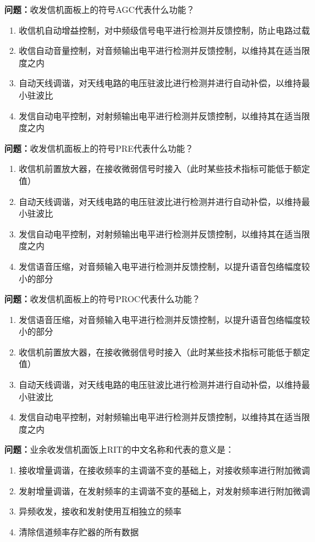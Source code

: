 \bigskip


\noindent\textbf{问题：}收发信机面板上的符号AGC代表什么功能？
\begin{enumerate}[label=\Alph*), leftmargin=3em]
\item 收信机自动增益控制，对中频级信号电平进行检测并反馈控制，防止电路过载
\item 收信自动音量控制，对音频输出电平进行检测并反馈控制，以维持其在适当限度之内
\item 自动天线调谐，对天线电路的电压驻波比进行检测并进行自动补偿，以维持最小驻波比
\item 发信自动电平控制，对射频输出电平进行检测并反馈控制，以维持其在适当限度之内
\end{enumerate}

\bigskip


\noindent\textbf{问题：}收发信机面板上的符号PRE代表什么功能？
\begin{enumerate}[label=\Alph*), leftmargin=3em]
\item 收信机前置放大器，在接收微弱信号时接入（此时某些技术指标可能低于额定值）
\item 自动天线调谐，对天线电路的电压驻波比进行检测并进行自动补偿，以维持最小驻波比
\item 发信自动电平控制，对射频输出电平进行检测并反馈控制，以维持其在适当限度之内
\item 发信语音压缩，对音频输入电平进行检测并反馈控制，以提升语音包络幅度较小的部分
\end{enumerate}

\bigskip


\noindent\textbf{问题：}收发信机面板上的符号PROC代表什么功能？
\begin{enumerate}[label=\Alph*), leftmargin=3em]
\item 发信语音压缩，对音频输入电平进行检测并反馈控制，以提升语音包络幅度较小的部分
\item 收信机前置放大器，在接收微弱信号时接入（此时某些技术指标可能低于额定值）
\item 自动天线调谐，对天线电路的电压驻波比进行检测并进行自动补偿，以维持最小驻波比
\item 发信自动电平控制，对射频输出电平进行检测并反馈控制，以维持其在适当限度之内
\end{enumerate}

\bigskip


\noindent\textbf{问题：}业余收发信机面饭上RIT的中文名称和代表的意义是：
\begin{enumerate}[label=\Alph*), leftmargin=3em]
\item 接收增量调谐，在接收频率的主调谐不变的基础上，对接收频率进行附加微调
\item 发射增量调谐，在发射频率的主调谐不变的基础上，对发射频率进行附加微调
\item 异频收发，接收和发射使用互相独立的频率
\item 清除信道频率存贮器的所有数据
\end{enumerate}

